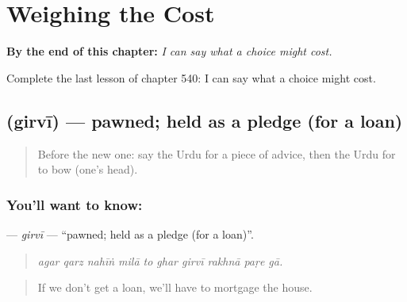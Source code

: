 
\chapter{Weighing the Cost}
\label{ch:ur-weighing-the-cost}

\begin{chapteropening}
\textbf{By the end of this chapter:} \emph{I can say what a choice might cost.}

Complete the last lesson of chapter 540: I can say what a choice might cost.
\end{chapteropening}

\section[\texorpdfstring{\ur{گروی} (girvī)}{گروی (girvī)}]{ (girvī) — pawned; held as a pledge (for a loan)}

\label{lesson:UR-C540-girvi}



\begin{quote}
Before the new one: say the Urdu for a piece of advice, then the Urdu for to bow (one's head).
\end{quote}

\subsection*{You'll want to know: }
\textbf{} — \emph{girvī} — \textquotedblleft{}pawned; held as a pledge (for a loan)\textquotedblright{}.

\begin{quote}
         
\end{quote}

\begin{quote}
\emph{agar qarz nahīṅ milā to ghar girvī rakhnā paṛe gā.}
\end{quote}

\begin{quote}
If we don't get a loan, we'll have to mortgage the house.
\end{quote}

